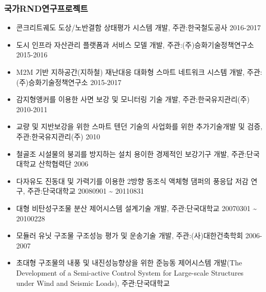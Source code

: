 \documentclass[]{article}
\providecommand{\tightlist}{%
  \setlength{\itemsep}{0pt}\setlength{\parskip}{0pt}}
\begin{document}
\subsubsection{국가RND연구프로젝트}\label{uxad6duxac00rnduxc5f0uxad6cuxd504uxb85cuxc81duxd2b8}

\begin{itemize}
\tightlist
\item 콘크리트궤도 도상/노반결함 상태평가 시스템 개발, 주관:한국철도공사 \hfill2016-2017
\item 도시 인프라 자산관리 플랫폼과 서비스 모델 개발, 주관:(주)승화기술정책연구소 \hfill2015-2016
\item M2M 기반 지하공간(지하철) 재난대응 대화형 스마트 네트워크 시스템 개발, 주관:(주)승화기술정책연구소 \hfill2015-2017
\item
  감지형앵커를 이용한 사면 보강 및 모니터링 기술 개발,
  주관:한국유지관리(주) 2010-2011
\item
  교량 및 지반보강을 위한 스마트 텐던 기술의 사업화를 위한 추가기술개발
  및 검증, 주관:한국유지관리(주) 2010
\item
  철골조 시설물의 붕괴를 방지하는 설치 용이한 경제적인 보강기구 개발,
  주관:단국대학교 산학협력단 2006
\item
  다자유도 진동대 및 가력기를 이용한 2방향 동조식 액체형 댐퍼의 풍응답
  저감 연구, 주관:단국대학교 20080901 \textasciitilde{} 20110831
\item
  대형 비탄성구조물 분산 제어시스템 설계기술 개발, 주관:단국대학교
  20070301 \textasciitilde{} 20100228
\item 모듈러 유닛 구조물 구조성능 평가 및 운송기술 개발, 주관:(사)대한건축학회 \hfill2006-2007
\item 초대형 구조물의 내풍 및 내진성능향상을 위한 준능동 제어시스템 개발(The Development of a Semi-active Control System for Large-scale Structures under Wind and Seismic Loads), 주관:단국대학교 \hfill
\end{itemize}

%
\end{document}
